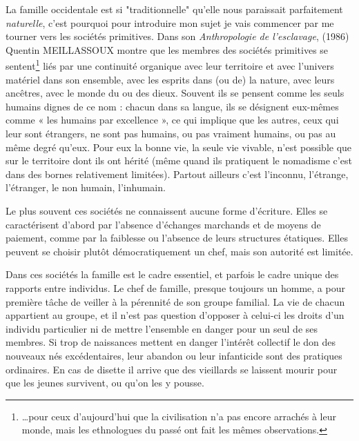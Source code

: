  La famille occidentale est si "traditionnelle" qu'elle nous paraissait parfaitement \emph{naturelle}, c'est pourquoi pour introduire mon sujet je vais commencer par me tourner vers les sociétés primitives. Dans son \emph{Anthropologie de l’esclavage}, (1986) Quentin MEILLASSOUX montre que les membres des sociétés primitives se sentent\footnote{…pour ceux d'aujourd'hui que la civilisation n'a pas encore arrachés à leur monde, mais les ethnologues du passé ont fait les mêmes observations.} liés par une continuité organique avec leur territoire et avec l'univers matériel dans son ensemble, avec les esprits dans (ou de) la nature, avec leurs ancêtres, avec le monde du ou des dieux. Souvent ils se pensent comme les seuls humains dignes de ce nom : chacun dans sa langue, ils se désignent eux-mêmes comme « les humains par excellence », ce qui implique que les autres, ceux qui leur sont étrangers, ne sont pas humains, ou pas vraiment humains, ou pas au même degré qu’eux. Pour eux la bonne vie, la seule vie vivable, n'est possible que sur le territoire dont ils ont hérité (même quand ils pratiquent le nomadisme c'est dans des bornes relativement limitées). Partout ailleurs c'est l'inconnu, l'étrange, l'étranger, le non humain, l'inhumain.

Le plus souvent ces sociétés ne connaissent aucune forme d'écriture. Elles se caractérisent d'abord par l'absence d'échanges marchands et de moyens de paiement, comme par la faiblesse ou l'absence de leurs structures étatiques. Elles peuvent se choisir plutôt démocratiquement un chef, mais son autorité est limitée. 

Dans ces sociétés la famille est le cadre essentiel, et parfois le cadre unique des rapports entre individus. Le chef de famille, presque toujours un homme, a pour première tâche de veiller à la pérennité de son groupe familial. La vie de chacun appartient au groupe, et il n'est pas question d'opposer à celui-ci les droits d'un individu particulier ni de mettre l'ensemble en danger pour un seul de ses membres. Si trop de naissances mettent en danger l'intérêt collectif le don des nouveaux nés excédentaires, leur abandon ou leur infanticide sont des pratiques ordinaires. En cas de disette il arrive que des vieillards se laissent mourir pour que les jeunes survivent, ou qu'on les y pousse.

